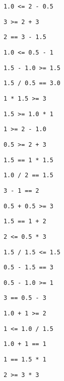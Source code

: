 \begin{exercise}
\begin{sltasks}
\begin{items}
    \item \texttt{ 1.0 <= 2 - 0.5 }
    \item \texttt{ 3 >= 2 + 3 }
    \item \texttt{ 2 == 3 - 1.5 }
    \item \texttt{ 1.0 <= 0.5 - 1 }
    \item \texttt{ 1.5 - 1.0 >= 1.5 }
  \end{items}
  \task
  \begin{items}
  \item \texttt{ 1.5 / 0.5 == 3.0 }
  \item \texttt{ 1 * 1.5 >= 3 }
  \item \texttt{ 1.5 >= 1.0 * 1 }
  \item \texttt{ 1 >= 2 - 1.0 }
  \item \texttt{ 0.5 >= 2 + 3 }
  \end{items}
  \task
  \begin{items}
  \item \texttt{ 1.5 == 1 * 1.5 }
  \item \texttt{ 1.0 / 2 == 1.5 }
  \item \texttt{ 3 - 1 == 2 }
  \item \texttt{ 0.5 + 0.5 >= 3 }
  \item \texttt{ 1.5 == 1 + 2 }
  \end{items}
  \task
  \begin{items}
  \item \texttt{ 2 <= 0.5 * 3 }
  \item \texttt{ 1.5 / 1.5 <= 1.5 }
  \item \texttt{ 0.5 - 1.5 == 3 }
  \item \texttt{ 0.5 - 1.0 >= 1 }
  \item \texttt{ 3 == 0.5 - 3 }
  \end{items}
  \task
  \begin{items}
  \item \texttt{ 1.0 + 1 >= 2 }
  \item \texttt{ 1 <= 1.0 / 1.5 }
  \item \texttt{ 1.0 + 1 == 1 }
  \item \texttt{ 1 == 1.5 * 1 }
  \item \texttt{ 2 >= 3 * 3 }
  \end{items}
\end{sltasks}
\end{exercise}

